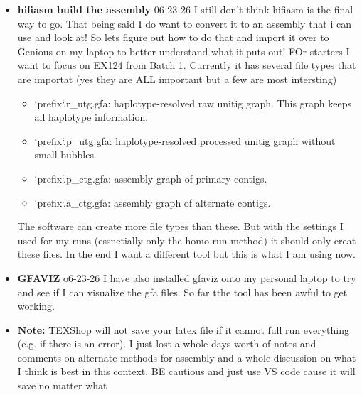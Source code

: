 \documentclass{article}
\begin{document}
\begin{itemize}
    \item \textbf{hifiasm build the assembly} {06-23-26}  I still don't think hifiasm is the final way to go.   That being said I do want to convert it to an assembly that i can use and look at!   So lets figure out how to do that and import it over to Genious on my laptop to better understand what it puts out!   FOr starters I want to focus on EX124 from Batch 1.    Currently it has several file types that are importat (yes they are ALL important but a few are most intersting)
    \begin{itemize}
        \item `prefix`.r_utg.gfa: haplotype-resolved raw unitig graph. This graph keeps all haplotype information.
        \item `prefix`.p_utg.gfa: haplotype-resolved processed unitig graph without small bubbles.
        \item `prefix`.p_ctg.gfa: assembly graph of primary contigs.
        \item `prefix`.a_ctg.gfa: assembly graph of alternate contigs.
    \end{itemize}     
    The software can create more file types than these.  But with the settings I used for my runs (essnetially only the homo run method) it should only creat these files.   In the end I want a different tool but this is what I am using now.

    \item \textbf{GFAVIZ} {o6-23-26} I have also installed gfaviz onto my personal laptop to try and see if I can visualize the gfa files.   So far tthe tool has been awful to get working.

    \item \textbf{Note:} TEXShop will not save your latex file if it cannot full run everything (e.g. if there is an error).  I just lost a whole days worth of notes and comments on alternate methods for assembly and a whole discussion on what I think is best in this context.   BE cautious and just use VS code cause it will save no matter what
	
	
    \end{itemize}








    \newpage
    \printbibliography

  
\end{document}

